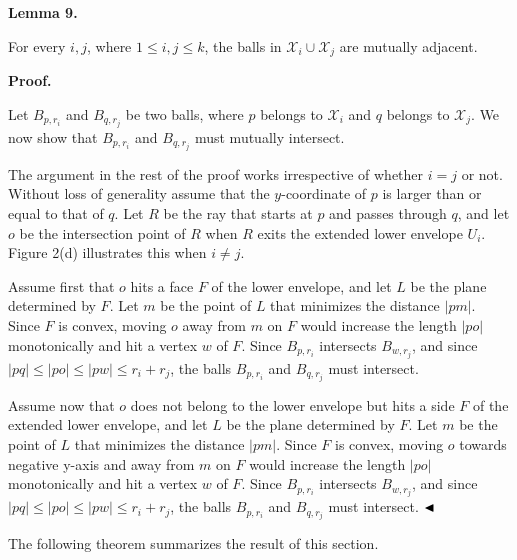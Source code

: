\documentclass[10pt,a4paper]{amsart}
\begin{document}
\par
\par
\par\medskip\noindent\textbf{Lemma 9.}\par
For every $i,j$, where $1\leq i,j\leq k$, the balls in $\mathcal{X}_{i}\cup\mathcal{X}_{j}$ are mutually adjacent.
\par
\par
\par
\par
\par\medskip\noindent\textbf{Proof.}\par
Let $B_{p,r_{i}}$ and $B_{q,r_{j}}$ be two balls, where $p$ belongs to $\mathcal{X}_{i}$ and $q$ belongs to $\mathcal{X}_{j}$. We now show that $B_{p,r_{i}}$ and $B_{q,r_{j}}$ must mutually intersect.
\par
\par
The argument in the rest of the proof works irrespective of whether $i=j$ or not. Without loss of generality assume that the $y$-coordinate of $p$ is larger than or equal to that of $q$. Let $R$ be the ray that starts at $p$ and passes through $q$, and let $o$ be the intersection point of $R$ when $R$ exits the extended lower envelope $U_{i}$. Figure 2(d) illustrates this when $i\not=j$.
\par
\par
Assume first that $o$ hits a face $F$ of the lower envelope, and let $L$ be the plane determined by $F$. Let $m$ be the point of $L$ that minimizes the distance $|pm|$. Since $F$ is convex, moving $o$ away from $m$ on $F$ would increase the length $|po|$ monotonically and hit a vertex $w$ of $F$. Since $B_{p,r_{i}}$ intersects $B_{w,r_{j}}$, and since $|pq|\leq|po|\leq|pw|\leq r_{i}+r_{j}$, the balls $B_{p,r_{i}}$ and $B_{q,r_{j}}$ must intersect.
\par
\par
Assume now that $o$ does not belong to the lower envelope but hits a side $F$ of the extended lower envelope, and let $L$ be the plane determined by $F$. Let $m$ be the point of $L$ that minimizes the distance $|pm|$. Since $F$ is convex, moving $o$ towards negative y-axis and away from $m$ on $F$ would increase the length $|po|$ monotonically and hit a vertex $w$ of $F$. Since $B_{p,r_{i}}$ intersects $B_{w,r_{j}}$, and since $|pq|\leq|po|\leq|pw|\leq r_{i}+r_{j}$, the balls $B_{p,r_{i}}$ and $B_{q,r_{j}}$ must intersect. $\hfill\blacktriangleleft$
\par
\par
The following theorem summarizes the result of this section.
\end{document}
